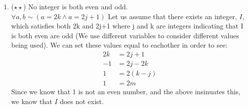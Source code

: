 \documentclass{letter}
\theoremstyle{definition}
\begin{document}
\begin{description}
\begin{enumerate}
		\item ($\star \star$) No integer is both even and odd. \\
$\forall a, b \sim (a=2k \wedge a=2j+1)$
Let us assume that there exists an integer, $I$, which satisfies both 2k and 2j+1 where j and k are integers indicating that I is both even are odd (We use different variables to consider different values being used). We can set these values equal to eachother in order to see:\\
\begin{align*}
2k &= 2j+1 \\
-1 &= 2j-2k \tag{subtracts 2k and -1 from both sides}\\
1 &= 2(k-j)\tag{multiplies -1 by both sides and factors out 2 from 2j-2k}\\
1 &= 2m \tag{Represents k-j as m}
\end{align*}
Since we know that 1 is not an even number, and the above insinuates this, we know that $I$ does not exist. \\


\end{enumerate}
\end{description}
\end{document}
